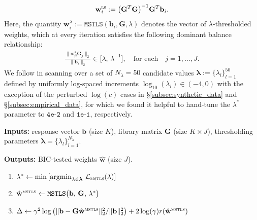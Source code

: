 \documentclass[journal=gmj]{CUP-JNL-DTM}%
\DeclareMathOperator*{\argmin}{argmin}
\theoremstyle{definition}
\numberwithin{equation}{section}
\begin{document}
\begin{appendix}
\begin{align*}
    \mathbf{w}^{\textsc{ls}}_{i} := \big(\mathbf{G}^T\mathbf{G}\big)^{-1}\mathbf{G}^T\mathbf{b}_i.
\end{align*} Here, the quantity $\mathbf{w}^{\lambda}_i := \texttt{MSTLS}(\mathbf{b}_i, \mathbf{G}, \lambda)$ denotes the vector of $\lambda$-thresholded weights, which at every iteration satisfies the following dominant balance relationship: \begin{align*}
    \frac{\|w^{\lambda}_{\!ji}\mathbf{G}_j\|_2}{\|\mathbf{b}_i\|_2} \in \big[\lambda, \, \lambda^{-1}\big],
    \quad \text{for each} \quad
    j = 1, \dots, J.
\end{align*} We follow \cite{Messenger.Bortz2021JournalofComputationalPhysics} in scanning over a set of $N_{\lambda} = 50$ candidate values $\boldsymbol{\lambda} := \{\lambda_l\}^{50}_{l=1}$ defined by uniformly log-spaced increments $\log_{10}(\lambda_l) \in (-4,0)$ with the exception of the perturbed $\log(c)$ cases in \S\ref{subsec:synthetic_data} and \S\ref{subsec:empirical_data}, for which we found it helpful to hand-tune the $\lambda^*$ parameter to $\texttt{4e-2}$ and $\texttt{1e-1}$, respectively.

\clearpage

{\color{black}
\begin{algorithm}
    {\color{black}
    \caption{MSTLS with BIC Testing for Trivial Dynamics}\label{algorthim:BIC_MSTLS}
    \textbf{Inputs:} response vector $\mathbf{b}$ (size $K$), library matrix $\mathbf{G}$ (size $K \times J$), thresholding parameters $\boldsymbol{\lambda} = \{\lambda_l\}_{l=1}^{N_{\lambda}}$.

    \textbf{Outputs:} BIC-tested weights $\hat{\mathbf{w}}$ (size $J$).
    
    \vspace{-2mm} \hrulefill \vspace{-2mm}
    \begin{enumerate}
        \smallskip
        
        \item $\lambda^* \leftarrow \min \left[\argmin_{\lambda \in \boldsymbol{\lambda}} \, \mathcal{L}_{\textsc{mstls}}(\lambda) \right]$

        \smallskip
        
        \item $\hat{\mathbf{w}}^{\textsc{mstls}} \leftarrow \texttt{MSTLS}\big(\mathbf{b}, \, \mathbf{G}, \, \lambda^*\big)$

        \smallskip

        \item $\Delta \leftarrow \gamma^2\log\left(\|\mathbf{b} - \mathbf{G}\hat{\mathbf{w}}^{\textsc{mstls}}\|^2_2 / \|\mathbf{b}\|^2_2\right) + 2\log(\gamma)r(\hat{\mathbf{w}}^{\textsc{mstls}})$


\end{enumerate}}
\end{algorithm}}
\end{appendix}
\end{document}
